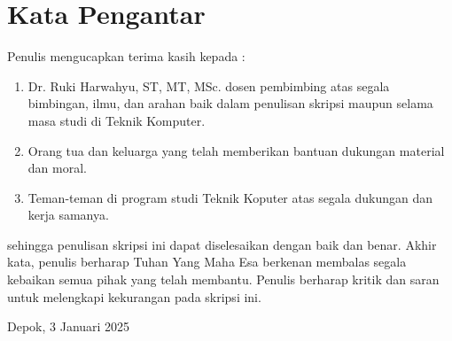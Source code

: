 \chapter*{Kata Pengantar}
Penulis mengucapkan terima kasih kepada :
\begin{enumerate}
  \item Dr. Ruki Harwahyu, ST, MT, MSc. dosen pembimbing atas segala bimbingan, ilmu, dan arahan baik dalam penulisan skripsi maupun selama masa studi di Teknik Komputer.
  \item Orang tua dan keluarga yang telah memberikan bantuan dukungan material dan moral.
  \item Teman-teman di program studi Teknik Koputer atas segala dukungan dan kerja samanya.
\end{enumerate}

sehingga penulisan skripsi ini dapat diselesaikan dengan baik dan benar. Akhir kata, penulis  berharap Tuhan Yang Maha Esa berkenan membalas segala kebaikan semua pihak yang telah membantu. Penulis berharap kritik dan saran untuk melengkapi kekurangan pada skripsi ini.

\vspace*{0.1cm}
\begin{flushright}
	Depok, 3 Januari 2025\\[0.1cm]
	\vspace*{1cm}
	\penulis

\end{flushright}
